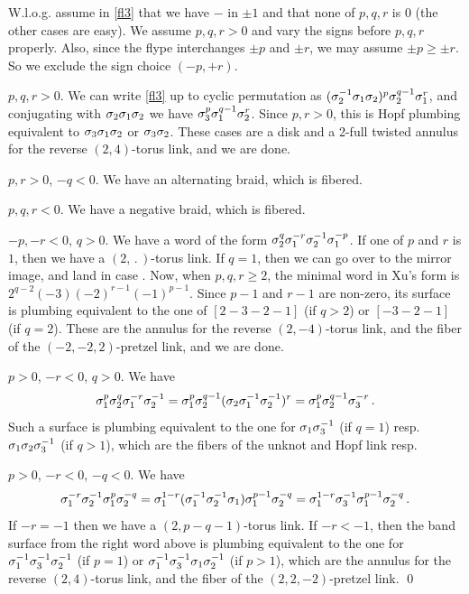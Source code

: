 W.l.o.g. assume in \eqref{fl3} that we have $-$ in $\pm 1$ and that none
of $p,q,r$ is $0$ (the other cases are easy). We assume $p,q,r>0$
and vary the signs before $p,q,r$ properly. Also, since the flype
interchanges $\pm p$ and $\pm r$, we may assume $\pm p\ge \pm r$.
So we exclude the sign choice $(-p,+r)$.

\begin{caselist}
\case $p,q,r>0$. We can write \eqref{fl3} up to cyclic permutation
as $(\sigma_2^{-1}\sigma_1\sigma_2)^p\sigma_2^{q-1}\sigma_1^r$, and conjugating with
$\sigma_2\sigma_1\sigma_2$ we have $\sigma_3^p\sigma_1^{q-1}\sigma_2^r$. Since $p,r>0$,
this is Hopf plumbing equivalent to $\sigma_3\sigma_1\sigma_2$ or $\sigma_3\sigma_2$.
These cases are a disk and a 2-full twisted annulus for
the reverse $(2,4)$-torus link, and we are done.\label{cs1}

\case $p,r>0$, $-q<0$. We have an alternating braid, which is
fibered.

\case $p,q,r<0$. We have a negative braid, which is fibered.

\case $-p,-r<0$, $q>0$. We have a word of the form 
$\sigma_2^{q}\sigma_1^{-r}\sigma_2^{-1}\sigma_1^{-p}$. If one of
$p$ and $r$ is $1$, then we have a $(2,\,.\,)$-torus link.
If $q=1$, then we can go over to the mirror image, and land in
case . Now, when $p,q,r\ge 2$, the
minimal word in Xu's form is $2^{q-2}(-3)(-2)^{r-1}(-1)^{p-1}$.
Since $p-1$ and $r-1$ are non-zero, its surface is plumbing
equivalent to the one of $[2-3-2-1]$ (if $q>2$) or $[-3-2-1]$
(if $q=2$). These are the annulus for the reverse $(2,-4)$-torus link,
and the fiber of the $(-2,-2,2)$-pretzel link, and we are done. 

\case $p>0$, $-r<0$, $q>0$.
We have 
\[
\sigma_1^p\sigma_2^q\sigma_1^{-r}\sigma_2^{-1}=\sigma_1^p\sigma_2^{q-1}
(\sigma_2\sigma_1^{-1}\sigma_2^{-1})^r=\sigma_1^p\sigma_2^{q-1}\sigma_3^{-r}\,.
\]
Such a surface is plumbing equivalent to the one for $\sigma_1\sigma_3^{-1}$
(if $q=1$) resp. $\sigma_1\sigma_2\sigma_3^{-1}$ (if $q>1$), which are the
fibers of the unknot and Hopf link resp.

\case $p>0$, $-r<0$, $-q<0$. We have 
\[
\sigma_1^{-r}\sigma_2^{-1}\sigma_1^p\sigma_2^{-q}=\sigma_1^{1-r}(\sigma_1^{-1}\sigma_2^
{-1}\sigma_1)\sigma_1^{p-1}\sigma_2^{-q}=\sigma_1^{1-r}\sigma_3^{-1}\sigma_1^{p-1}
\sigma_2^{-q}\,.
\]
If $-r=-1$ then we have a $(2,p-q-1)$-torus link. If $-r<-1$, then
the band surface from the right word above is plumbing equivalent to the
one for $\sigma_1^{-1}\sigma_3^{-1}\sigma_2^{-1}$ (if $p=1$) or 
$\sigma_1^{-1}\sigma_3^{-1}\sigma_1\sigma_2^{-1}$ (if $p>1$), which are the
annulus for the reverse $(2,4)$-torus link, and the fiber of the
$(2,2,-2)$-pretzel link. \qed
\end{caselist}

